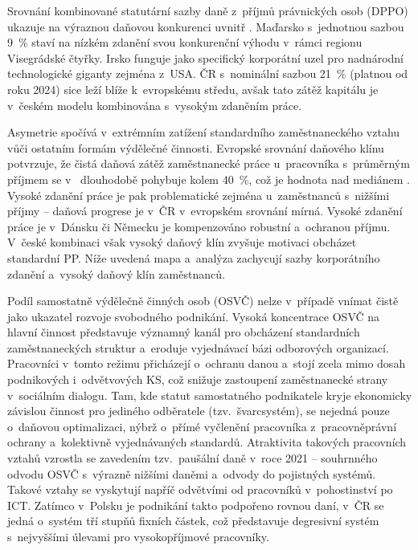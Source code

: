 Srovnání kombinované statutární sazby daně z~příjmů právnických osob (\acs{DPPO}) ukazuje na výraznou daňovou konkurenci uvnitř . Maďarsko s~jednotnou sazbou \SI{9}{\percent} staví na nízkém zdanění svou konkurenční výhodu v~rámci regionu Visegrádské čtyřky. Irsko funguje jako specifický korporátní uzel pro nadnárodní technologické giganty zejména z~USA. \ac{ČR} s~nominální sazbou \SI{21}{\percent} (platnou od roku \SI{2024}{\rok}) sice leží blíže k~evropskému středu, avšak tato zátěž kapitálu je v~českém modelu kombinována s~vysokým zdaněním práce.\par




Asymetrie spočívá v~extrémním zatížení standardního zaměstnaneckého vztahu vůči ostatním formám výdělečné činnosti. Evropské srovnání daňového klínu potvrzuje, že čistá daňová zátěž zaměstnanecké práce u~pracovníka s~průměrným příjmem se v~ dlouhodobě pohybuje kolem \SI{40}{\percent}, což je hodnota nad mediánem . Vysoké zdanění práce je pak problematické zejména u~zaměstnanců s~nižšími příjmy -- daňová progrese je v~\acs{ČR} v~evropském srovnání mírná. Vysoké zdanění práce je v~Dánsku či Německu je kompenzováno robustní  a~ochranou příjmu. V~české kombinaci však vysoký daňový klín zvyšuje motivaci obcházet standardní \ac{PP}. Níže uvedená mapa a~analýza zachycují sazby korporátního zdanění a~vysoký daňový klín zaměstnanců.\par



Podíl samostatně výdělečně činných osob (\acs{OSVČ}) nelze v~případě  vnímat čistě jako ukazatel rozvoje svobodného podnikání. Vysoká koncentrace \acs{OSVČ} na hlavní činnost představuje významný kanál pro obcházení standardních zaměstnaneckých struktur a~eroduje vyjednávací bázi odborových organizací. Pracovníci v~tomto režimu přicházejí o~ochranu danou  a~stojí zcela mimo dosah podnikových i~odvětvových \acs{KS}, což snižuje zastoupení zaměstnanecké strany v~sociálním dialogu. Tam, kde statut samostatného podnikatele kryje ekonomicky závislou činnost pro jediného odběratele (tzv.~švarcsystém), se nejedná pouze o~daňovou optimalizaci, nýbrž o~přímé vyčlenění pracovníka z~pracovněprávní ochrany a~kolektivně vyjednávaných standardů. Atraktivita takových pracovních vztahů vzrostla se zavedením tzv.~paušální daně v~roce 2021 -- souhrnného odvodu \acs{OSVČ} s~výrazně nižšími daněmi a~odvody do pojistných systémů. Takové vztahy se vyskytují napříč odvětvími od pracovníků v~pohostinství po \acs{ICT}. Zatímco v~Polsku je podnikání takto podpořeno rovnou daní, v~\acs{ČR} se jedná o~systém tří stupňů fixních částek, což představuje degresivní systém s~nejvyššími úlevami pro vysokopříjmové pracovníky.\par

